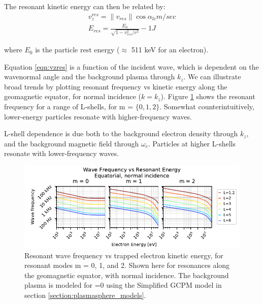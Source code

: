 The resonant kinetic energy can then be related by:
\begin{eqnarray}
v_z^{res} = \|v_{res}\|\cos\alpha_{lc}  \unit{m/sec}\\ 
E_{res} = \frac{E_{0}}{\sqrt{1 - v_{res}^2/c^2}} - 1 \unit{J}
\end{eqnarray}

\noindent where $E_{0}$ is the particle rest energy ($\approx$ 511 keV for an electron).

Equation \eqref{eqn:vzres} is a function of the incident wave, which is dependent on the wavenormal angle and the background plasma through $k_z$. We can illustrate broad trends by plotting resonant frequency vs kinetic energy along the geomagnetic equator, for normal incidence ($k = k_z$). Figure \ref{fig:vzres_vs_modes} shows the resonant frequency for a range of L-shells, for m = $\{0,1,2\}$. Somewhat counterintuitively, lower-energy particles resonate with higher-frequency waves.

L-shell dependence is due both to the background electron density through $k_z$, and the background magnetic field through $\omega_c$. Particles at higher L-shells resonate with lower-frequency waves.

\begin{figure}[h]
\begin{center}
\includegraphics{figures/wave_frequency_vs_energy_vs_mode_3up.pdf}

\caption[Resonant frequency vs particle energy for resonant modes 0, 1, and 2]{Resonant wave frequency vs trapped electron kinetic energy, for resonant modes m = 0, 1, and 2. Shown here for resonances along the geomagnetic equator, with normal incidence. The background plasma is modeled for \kp{}=0 using the Simplified GCPM model in section \ref{section:plasmasphere_models}.}
\label{fig:vzres_vs_modes}
\end{center}
\end{figure}

